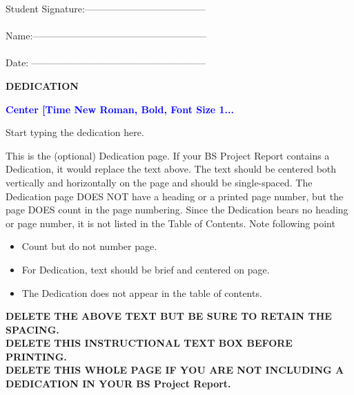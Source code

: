\documentclass[a4paper,12pt,one side]{report}
\theoremstyle{definition}
\begin{document}
\begin{flushright}
Student Signature:--------------------------------------\\~\\
Name:------------------------------------------------------ \\~\\					
Date: ------------------------------------------------------ \\			\end{flushright}
\NoBgThispage  
  \newpage
	\thispagestyle{empty}
\begin{center}
\textbf {DEDICATION}
\end{center}
\begin{center}
{{\small
  \bfseries \textcolor{blue}{Center [Time New Roman, Bold, Font Size 1...}
}
}\\
\end{center}
Start typing the dedication here.
\vspace{2cm}

\begin{tcolorbox}[enhanced jigsaw,
    sharp corners,
    boxrule=0.5pt, 
    colback=blue!30!white,   
    borderline={0.5pt}{-2pt}{black,solid} %
 ]
 \begin{justify}
     
 
This is the (optional) Dedication page. If your BS Project Report contains a Dedication, it would replace the text above. The text should be centered both vertically and horizontally on the page and should be single-spaced. The Dedication page DOES NOT have a heading or a printed page number, but the page DOES count in the page numbering. Since the Dedication bears no heading or page number, it is not listed in the Table of Contents.
Note following point
\begin{itemize}
\item Count but do not number page.
\item For Dedication, text should be brief and centered on page.
\item The Dedication does not appear in the table of contents.
\end{itemize}
\textbf {DELETE THE ABOVE TEXT BUT BE SURE TO RETAIN THE SPACING.\\
DELETE THIS INSTRUCTIONAL TEXT BOX BEFORE PRINTING.\\
DELETE THIS WHOLE PAGE IF YOU ARE NOT INCLUDING A DEDICATION IN YOUR BS Project Report.}
\end{justify}
\end{tcolorbox}
\end{document}
